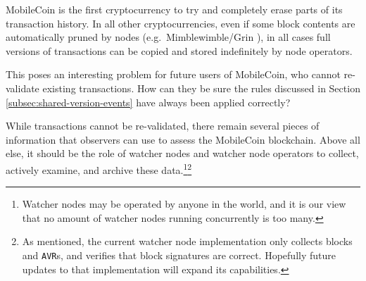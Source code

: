 MobileCoin is the first cryptocurrency to try and completely erase parts of its transaction history. In all other cryptocurrencies, even if some block contents are automatically pruned by nodes (e.g.\ Mimblewimble/Grin  \cite{intro-mimblewimble-grin}), in all cases full versions of transactions can be copied and stored indefinitely by node operators.

This poses an interesting problem for future users of MobileCoin, who cannot re-validate existing transactions. How can they be sure the rules discussed in Section \ref{subsec:shared-version-events} have always been applied correctly?

While transactions cannot be re-validated, there remain several pieces of information that observers can use to assess the MobileCoin blockchain. Above all else, it should be the role of watcher nodes and watcher node operators to collect, actively examine, and archive these data.\footnote{Watcher nodes may be operated by anyone in the world, and it is our view that no amount of watcher nodes running concurrently is too many.}\footnote{As mentioned, the current watcher node implementation only collects blocks and {\tt AVR}s, and verifies that block signatures are correct. Hopefully future updates to that implementation will expand its capabilities.}

